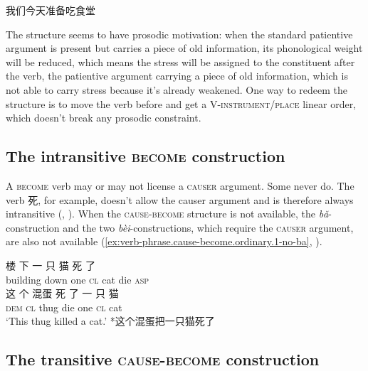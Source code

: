 \documentclass[UTF8, a4paper, oneside, scheme=plain, 12pt]{ctexrep}
\newcommand{\form}[1]{\emph{#1}}
\newcommand{\translate}[1]{`#1'}
\newcommand*{\category}[1]{\textsc{#1}}
\begin{document}
\begin{exe}
    \ex 我们今天准备吃食堂
\end{exe}

The structure seems to have prosodic motivation:
when the standard patientive argument is present 
but carries a piece of old information,
its phonological weight will be reduced,
which means the stress will be assigned to the constituent after the verb,
the patientive argument carrying a piece of old information,
which is not able to carry stress because it's already weakened.
One way to redeem the structure 
is to move the verb before 
and get a V-\category{instrument/place} linear order, 
which doesn't break any prosodic constraint.


\subsection{The intransitive \category{become} construction}\label{sec:vp.become}

A \category{become} verb may or may not license a \category{causer} argument.
Some never do. 
The verb 死, for example, doesn't allow the causer argument
and is therefore always intransitive
(,
).
When the \category{cause}-\category{become} structure is not available,
the \form{bǎ}-construction 
and the two \form{bèi}-constructions,
which require the \category{causer} argument, 
are also not available
(\ref{ex:verb-phrase.cause-become.ordinary.1-no-ba},
).

\begin{exe}
    \ex\label{ex:verb-phrase.cause-become.ordinary.1} \gll 楼 下 一 只 猫 死 了  \\
    building down one \category{cl} cat die \category{asp} \\ 
    \ex\label{ex:verb-phrase.cause-become.ordinary.1-no-transitive} \gll * 这 个 混蛋 死 了 一 只 猫 \\
    {} \category{dem} \category{cl} thug die one \category{cl} cat \\ 
    \translate{This thug killed a cat.} 
    \ex\label{ex:verb-phrase.cause-become.ordinary.1-no-ba} *这个混蛋把一只猫死了
\end{exe}

\subsection{The transitive \category{cause}-\category{become} construction}
\label{sec:verb-phrase.cause-become.ordinary}
\end{document}

